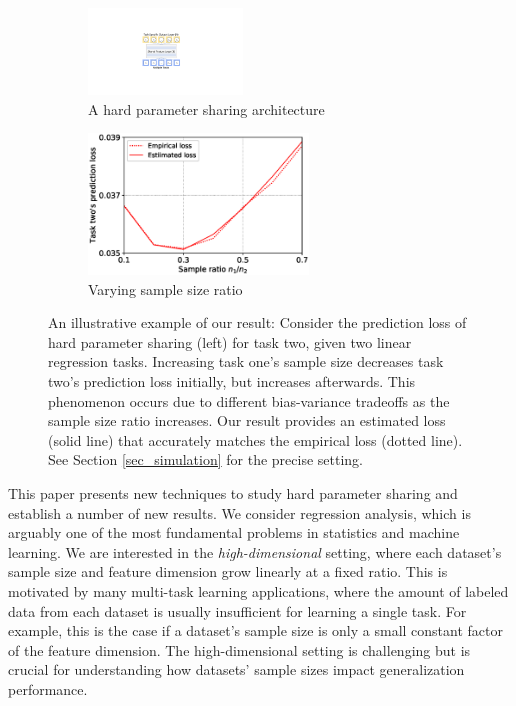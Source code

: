 \begin{figure}[!t]
	\begin{subfigure}[t]{0.5\textwidth}
		\centering
		\includegraphics[width=0.45\textwidth,valign=t]{figures/mtl_model_arch.pdf}
		\caption{A hard parameter sharing architecture}
	\end{subfigure}\hfill
	\begin{subfigure}[t]{0.5\textwidth}
		\centering
		\includegraphics[width=0.6417\textwidth,valign=t]{figures/sample_ratio_c2_400.eps}
		\caption{Varying sample size ratio}
		\label{fig_intro_sample_size_b}
	\end{subfigure}
	\vspace{-0.1in}
	\caption{An illustrative example of our result:
	Consider the prediction loss of hard parameter sharing (left) for task two, given two linear regression tasks.
	Increasing task one's sample size decreases task two's prediction loss initially, but increases afterwards. This phenomenon occurs due to different bias-variance tradeoffs as the sample size ratio increases. Our result provides an estimated loss (solid line) that accurately matches the empirical loss (dotted line).
	See Section \ref{sec_simulation} for the precise setting.}
	\label{fig_intro_sample_size}
	\vspace{-0.1in}
\end{figure}



This paper presents new techniques to study hard parameter sharing and establish a number of new results.
We consider regression analysis, which is arguably one of the most fundamental problems in statistics and machine learning.
We are interested in the \textit{high-dimensional} setting, where each dataset's sample size and feature dimension grow linearly at a fixed ratio.
This is motivated by many multi-task learning applications, where the amount of labeled data from each dataset is usually insufficient for learning a single task.
For example, this is the case if a dataset's sample size is only a small constant factor of the feature dimension.
The high-dimensional setting is challenging but is crucial for understanding how datasets' sample sizes impact generalization performance.
